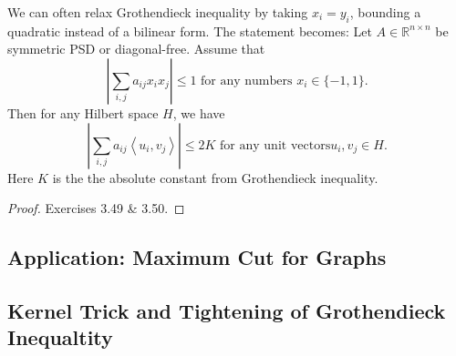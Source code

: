 \begin{remark}
\label{rmk:3.5.3}
We can often relax Grothendieck inequality by taking $x_i = y_i$, bounding a quadratic instead of a bilinear 
form. The statement becomes: Let $A \in \mathbb{R}^{n \times n}$ be symmetric PSD or diagonal-free. Assume that 
\[ \left| \sum_{i, j}^{} a_{ij}x_ix_j \right| \leq 1 \text{ for any numbers } x_i \in \{-1, 1\}. \]
Then for any Hilbert space $H$, we have 
\[ \left| \sum_{i, j}^{} a_{ij}\left\langle u_i, v_j \right\rangle \right| \leq 2K \text{ for any unit vectors} 
u_i, v_j \in H. \]
Here $K$ is the the absolute constant from Grothendieck inequality.
\end{remark}

\begin{proof}
Exercises 3.49 \& 3.50.
\end{proof}



\subsection{Application: Maximum Cut for Graphs}




\subsection{Kernel Trick and Tightening of Grothendieck Inequaltity}


